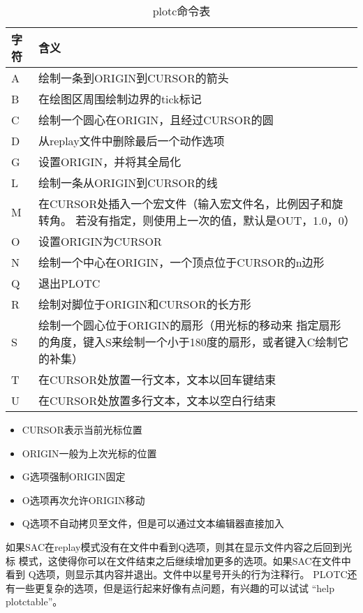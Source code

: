 \begin{table}[!ht]
\centering
\ttfamily
\small
\caption{plotc命令表}
\begin{tabular}{p{1cm}p{10cm}}
	\toprule
	字符	& 	含义	\\
	\midrule
	A		&	绘制一条到ORIGIN到CURSOR的箭头	\\
	B		&	在绘图区周围绘制边界的tick标记  \\
	C		&	绘制一个圆心在ORIGIN，且经过CURSOR的圆	\\
	D		&	从replay文件中删除最后一个动作选项	\\
	G		&	设置ORIGIN，并将其全局化	\\
	L		& 	绘制一条从ORIGIN到CURSOR的线	\\
	M		&	在CURSOR处插入一个宏文件（输入宏文件名，比例因子和旋转角。
                若没有指定，则使用上一次的值，默认是OUT，1.0，0）\\
	O		&	设置ORIGIN为CURSOR		\\
	N		&	绘制一个中心在ORIGIN，一个顶点位于CURSOR的n边形 \\
	Q		&	退出PLOTC	\\
	R		&	绘制对脚位于ORIGIN和CURSOR的长方形	\\
	S		&	绘制一个圆心位于ORIGIN的扇形（用光标的移动来
                指定扇形的角度，键入S来绘制一个小于180度的扇形，或者键入C绘制它的补集）\\
	T		&	在CURSOR处放置一行文本，文本以回车键结束	\\
	U		&	在CURSOR处放置多行文本，文本以空白行结束	\\
	\bottomrule
\end{tabular}
\end{table}
\begin{itemize}
\item CURSOR表示当前光标位置
\item ORIGIN一般为上次光标的位置
\item G选项强制ORIGIN固定
\item O选项再次允许ORIGIN移动
\item Q选项不自动拷贝至文件，但是可以通过文本编辑器直接加入
\end{itemize}
如果SAC在replay模式没有在文件中看到Q选项，则其在显示文件内容之后回到光标
模式，这使得你可以在文件结束之后继续增加更多的选项。如果SAC在文件中看到
Q选项，则显示其内容并退出。文件中以星号开头的行为注释行。
PLOTC还有一些更复杂的选项，但是运行起来好像有点问题，有兴趣的可以试试
``help plotctable''。
